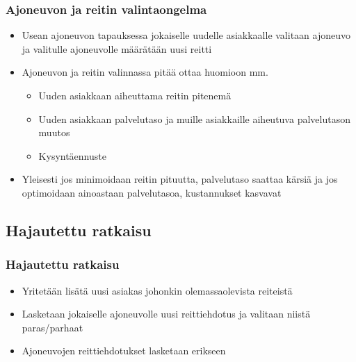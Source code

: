 \documentclass{beamer}
\begin{document}
    
    
\begin{frame}
  \frametitle{Ajoneuvon ja reitin valintaongelma}   %
\begin{itemize}
 \item 
 Usean ajoneuvon tapauksessa jokaiselle uudelle asiakkaalle valitaan ajoneuvo ja valitulle ajoneuvolle määrätään uusi reitti
  \item
 Ajoneuvon ja reitin valinnassa pitää ottaa huomioon mm.
 \begin{itemize}
  \item 
  Uuden asiakkaan aiheuttama reitin pitenemä
  \item
  Uuden asiakkaan palvelutaso ja muille asiakkaille aiheutuva palvelutason muutos
  \item
  Kysyntäennuste
 \end{itemize}
\item
Yleisesti jos minimoidaan reitin pituutta, palvelutaso saattaa kärsiä ja jos optimoidaan ainoastaan palvelutasoa, kustannukset kasvavat
\end{itemize}
\end{frame}

\subsection{Hajautettu ratkaisu}
\begin{frame}
  \frametitle{Hajautettu ratkaisu}   %
\begin{itemize}
\item
Yritetään lisätä uusi asiakas johonkin olemassaolevista reiteistä %
\item
Lasketaan jokaiselle ajoneuvolle uusi reittiehdotus ja valitaan niistä paras/parhaat
\item
Ajoneuvojen reittiehdotukset lasketaan erikseen
\end{itemize}
\end{frame}
\end{document}
